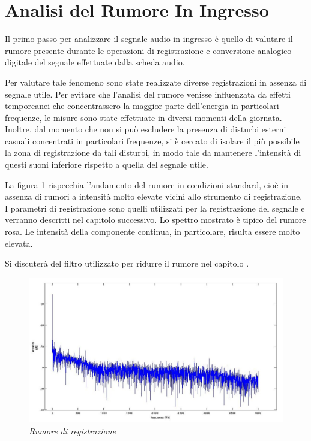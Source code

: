 \chapter*{Analisi del Rumore In Ingresso}\label{cap:rumore}

Il primo passo per analizzare il segnale audio in ingresso è quello di valutare il rumore presente durante le operazioni di registrazione e conversione analogico-digitale del segnale effettuate dalla scheda audio. 

Per valutare tale fenomeno sono state realizzate diverse registrazioni in assenza di segnale utile. 
Per evitare che l'analisi del rumore venisse influenzata da effetti temporeanei che concentrassero la maggior parte dell'energia in particolari frequenze, le misure sono state effettuate in diversi momenti della giornata.
Inoltre, dal momento che non si può escludere la presenza di disturbi esterni casuali concentrati in particolari frequenze, si è cercato di isolare il più possibile la zona di registrazione da tali disturbi, in modo tale da mantenere l'intensità di questi suoni inferiore rispetto a quella del segnale utile.
 
La figura \ref{fig:rumore} rispecchia l'andamento del rumore in condizioni standard, cioè in assenza di rumori a intensità molto elevate vicini allo strumento di registrazione. 
I parametri di registrazione sono quelli utilizzati per la registrazione del segnale e verranno descritti nel capitolo successivo.
Lo spettro mostrato è tipico del rumore rosa. 
Le intensità della componente continua, in particolare, risulta essere molto elevata.

Si discuterà del filtro utilizzato per ridurre il rumore nel capitolo .

	\begin{figure}[h]
	  \begin{center} 
	    \includegraphics[width=\textwidth*\real{0.9}]{images/ch_02/spettro_rumore.jpg}
	  \end{center} 
	  \caption{\textit{Rumore di registrazione}}  
	  \label{fig:rumore}
	\end{figure}



